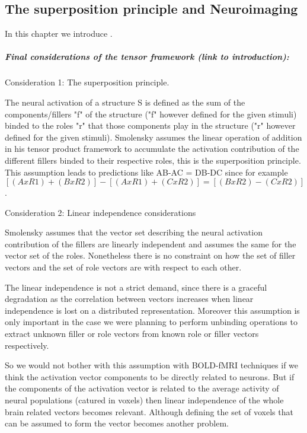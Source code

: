 \begin{fullwidth}
\chapter{\label{ch:super_intro}
The superposition principle and Neuroimaging}
\end{fullwidth}

\begin{chabstract}

In this chapter we introduce .

\end{chabstract}


\paragraph{Final considerations of the tensor framework (link to introduction):}


Consideration 1: The superposition principle.

The neural activation of a structure S is defined as the sum of the components/fillers "f" of the structure ("f" however defined for the given stimuli) binded to the roles "r" that those components play in the structure ("r" however defined for the given stimuli). Smolensky assumes the linear operation of addition in his tensor product framework to accumulate the activation contribution of the different fillers binded to their respective roles, this is the superposition principle. This assumption leads to predictions like AB-AC = DB-DC since for example $[(AxR1) + (BxR2)] - [(AxR1) + (CxR2)] = [(BxR2) - (CxR2)]$.

Consideration 2: Linear independence considerations

Smolensky assumes that the vector set describing the neural activation contribution of the fillers are linearly independent and assumes the same for the vector set of the roles. Nonetheless there is no constraint on how the set of filler vectors and the set of role vectors are with respect to each other.

The linear independence is not a strict demand, since there is a graceful degradation as the correlation between vectors increases when linear independence is lost on a distributed representation. Moreover this assumption is only important in the case we were planning to perform unbinding operations to extract unknown filler or role vectors from known role or filler vectors respectively.

So we would not bother with this assumption with BOLD-fMRI techniques if we think the activation vector components to be directly related to neurons. But if the components of the activation vector is related to the average activity of neural populations (catured in voxels) then linear independence of the whole brain related vectors becomes relevant. Although defining the set of voxels that can be assumed to form the vector becomes another problem.

